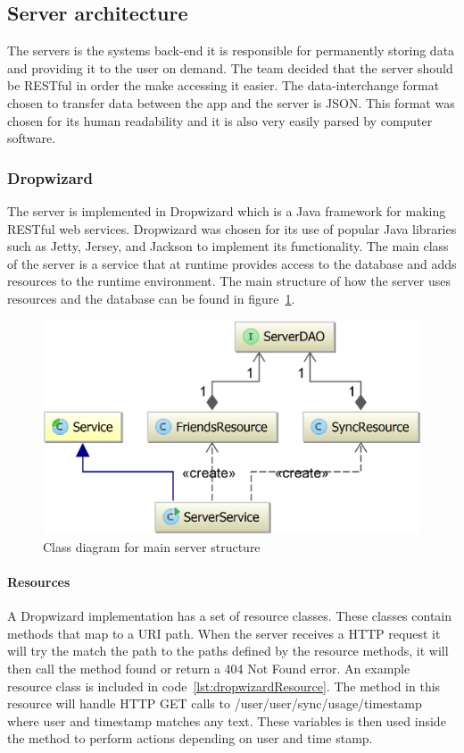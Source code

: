 \label{sec:arch_server}
\subsection{Server architecture}
The servers is the systems back-end it is responsible for permanently storing data and providing it to the user on demand. The team decided that the server should be RESTful in order the make accessing it easier. The data-interchange format chosen to transfer data between the app and the server is JSON. This format was chosen for its human readability and it is also very easily parsed by computer software.

\subsubsection{Dropwizard}
The server is implemented in Dropwizard which is a Java framework for making RESTful web services. Dropwizard was chosen for its use of popular Java libraries such as Jetty, Jersey, and Jackson to implement its functionality. The main class of the server is a service that at runtime provides access to the database and adds resources to the runtime environment. The main structure of how the server uses resources and the database can be found in figure~\ref{fig:classDiagramServer}.

\begin{figure}[H]
\includegraphics[width=\textwidth]{ch/architecture/fig/classDiagramServer.png}
\caption{Class diagram for main server structure}
\label{fig:classDiagramServer}
\end{figure}

\paragraph{Resources}
A Dropwizard implementation has a set of resource classes. These classes contain methods that map to a URI path. When the server receives a HTTP request it will try the match the path to the paths defined by the resource methods, it will then call the method found or return a 404 Not Found error. An example resource class is included in code~\ref{lst:dropwizardResource}. The method in this resource will handle HTTP GET calls to /user/{user}/sync/usage/{timestamp} where {user} and {timestamp} matches any text. These variables is then used inside the method to perform actions depending on user and time stamp.

